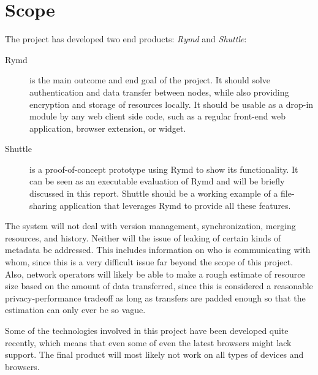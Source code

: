 \section{Scope}

The project has developed two end products: \emph{Rymd} and \emph{Shuttle}:

\begin{description}
\item[Rymd] is the main outcome and end goal of the project. It should solve authentication and data transfer between nodes, while also providing encryption and storage of resources locally. It should be usable as a drop-in module by any web client side code, such as a regular front-end web application, browser extension, or widget.

\item[Shuttle] is a proof-of-concept prototype using Rymd to show its functionality. It can be seen as an executable evaluation of Rymd and will be briefly discussed in this report. Shuttle should be a working example of a file-sharing application that leverages Rymd to provide all these features.
\end{description}

The system will not deal with version management, synchronization, merging resources, and history. Neither will the issue of leaking of certain kinds of metadata be addressed. This includes information on who is communicating with whom, since this is a very difficult issue far beyond the scope of this project. Also, network operators will likely be able to make a rough estimate of resource size based on the amount of data transferred, since this is considered a reasonable privacy-performance tradeoff as long as transfers are padded enough so that the estimation can only ever be so vague.

Some of the technologies involved in this project have been developed quite recently, which means that even some of even the latest browsers might lack support. The final product will most likely not work on all types of devices and browsers.
